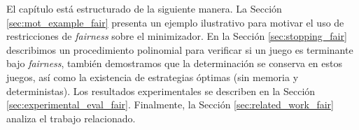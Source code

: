 

El capítulo está estructurado de la siguiente manera. La Sección \ref{sec:mot_example_fair} presenta un ejemplo ilustrativo para motivar el uso de restricciones de \textit{fairness} sobre el minimizador.
En la Sección \ref{sec:stopping_fair} describimos un procedimiento polinomial para verificar si un juego es terminante bajo \textit{fairness},
también demostramos que la determinación se conserva en estos juegos, así como la existencia de estrategias óptimas (sin memoria y deterministas).
Los resultados experimentales se describen en la Sección  \ref{sec:experimental_eval_fair}.
Finalmente, la Sección \ref{sec:related_work_fair} analiza el trabajo relacionado.

